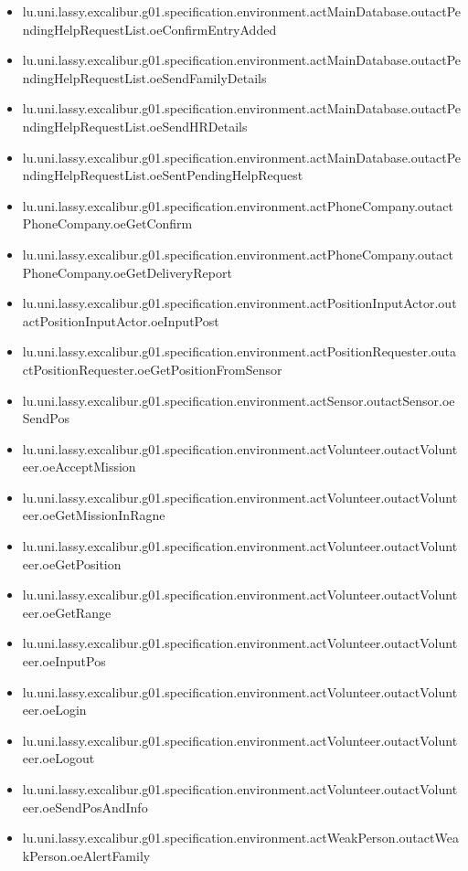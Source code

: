 \begin{itemize}
\item lu.uni.lassy.excalibur.g01.specification.environment.actMainDatabase.outactPendingHelpRequestList.oeConfirmEntryAdded 
\item lu.uni.lassy.excalibur.g01.specification.environment.actMainDatabase.outactPendingHelpRequestList.oeSendFamilyDetails 
\item lu.uni.lassy.excalibur.g01.specification.environment.actMainDatabase.outactPendingHelpRequestList.oeSendHRDetails 
\item lu.uni.lassy.excalibur.g01.specification.environment.actMainDatabase.outactPendingHelpRequestList.oeSentPendingHelpRequest 
\item lu.uni.lassy.excalibur.g01.specification.environment.actPhoneCompany.outactPhoneCompany.oeGetConfirm 
\item lu.uni.lassy.excalibur.g01.specification.environment.actPhoneCompany.outactPhoneCompany.oeGetDeliveryReport 
\item lu.uni.lassy.excalibur.g01.specification.environment.actPositionInputActor.outactPositionInputActor.oeInputPost 
\item lu.uni.lassy.excalibur.g01.specification.environment.actPositionRequester.outactPositionRequester.oeGetPositionFromSensor 
\item lu.uni.lassy.excalibur.g01.specification.environment.actSensor.outactSensor.oeSendPos 
\item lu.uni.lassy.excalibur.g01.specification.environment.actVolunteer.outactVolunteer.oeAcceptMission 
\item lu.uni.lassy.excalibur.g01.specification.environment.actVolunteer.outactVolunteer.oeGetMissionInRagne 
\item lu.uni.lassy.excalibur.g01.specification.environment.actVolunteer.outactVolunteer.oeGetPosition 
\item lu.uni.lassy.excalibur.g01.specification.environment.actVolunteer.outactVolunteer.oeGetRange 
\item lu.uni.lassy.excalibur.g01.specification.environment.actVolunteer.outactVolunteer.oeInputPos 
\item lu.uni.lassy.excalibur.g01.specification.environment.actVolunteer.outactVolunteer.oeLogin 
\item lu.uni.lassy.excalibur.g01.specification.environment.actVolunteer.outactVolunteer.oeLogout 
\item lu.uni.lassy.excalibur.g01.specification.environment.actVolunteer.outactVolunteer.oeSendPosAndInfo 
\item lu.uni.lassy.excalibur.g01.specification.environment.actWeakPerson.outactWeakPerson.oeAlertFamily 

\end{itemize}
